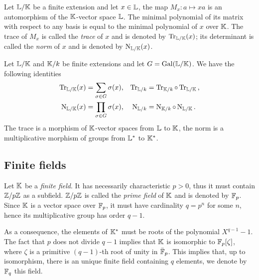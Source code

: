   Let $\mathbb{L}/\mathbb{K}$ be a finite
extension and let $x\in\mathbb{L}$, the map $M_x:a\mapsto xa$ is an
automorphism of the $\mathbb{K}$-vector space $\mathbb{L}$. The minimal polynomial of
its matrix with respect to any basis is equal to the minimal
polynomial of $x$ over $\mathbb{K}$.  The trace of $M_x$ is called the
\emph{trace} of $x$ and is denoted
by $\operatorname{Tr}_{\mathbb{L}/\mathbb{K}}(x)$; its determinant is called the \emph{norm} of
$x$ and is denoted by
$\operatorname{N}_{\mathbb{L}/\mathbb{K}}(x)$.

\begin{proposition}
  \label{th:basic-galois-theory:trace}
  Let $\mathbb{L}/\mathbb{K}$ and $\mathbb{K}/k$ be finite extensions and let
  $G=\operatorname{Gal}(\mathbb{L}/\mathbb{K})$. We have the following identities
  \begin{align*}
    \operatorname{Tr}_{\mathbb{L}/\mathbb{K}}(x) &= \sum_{\sigma\in G}\sigma(x) \text{,}&
    \operatorname{Tr}_{\mathbb{L}/k} &= \operatorname{Tr}_{\mathbb{K}/k}\circ\operatorname{Tr}_{\mathbb{L}/\mathbb{K}}\text{,}\\
    \operatorname{N}_{\mathbb{L}/\mathbb{K}}(x) &= \prod_{\sigma\in G}\sigma(x) \text{,}&
    \operatorname{N}_{\mathbb{L}/k} &= \operatorname{N}_{\mathbb{K}/k}\circ\operatorname{N}_{\mathbb{L}/\mathbb{K}}\text{.}
  \end{align*}
  The trace is a morphism of $\mathbb{K}$-vector spaces from $\mathbb{L}$ to $\mathbb{K}$,
  the norm is a multiplicative morphism of groups from $\mathbb{L}^\ast$ to
  $\mathbb{K}^\ast$.
\end{proposition}


\subsection{Finite fields}
\label{sec:basic-galois-theory:finite-fields}

Let $\mathbb{K}$ be a  \emph{finite field}. It has
necessarily characteristic $p>0$, thus it must contain $\mathbb{Z}/p\mathbb{Z}$ as a
subfield. $\mathbb{Z}/p\mathbb{Z}$ is called the \emph{prime
  field} of $\mathbb{K}$ and is denoted by $\mathbb{F}_p$. Since $\mathbb{K}$ is a vector
space over $\mathbb{F}_p$, it must have cardinality $q=p^n$ for some $n$,
hence its multiplicative group has order $q-1$.

As a consequence, the elements of $\mathbb{K}^\ast$ must be roots of the
polynomial $X^{q-1}-1$. The fact that $p$ does not divide $q-1$
implies that $\mathbb{K}$ is isomorphic to $\mathbb{F}_p[\zeta]$, where $\zeta$ is a
primitive $(q-1)$-th root of unity in $\bar{\mathbb{F}}_p$. This implies
that, up to isomorphism, there is an unique finite field containing
$q$ elements, we denote by $\mathbb{F}_q$ this field.

